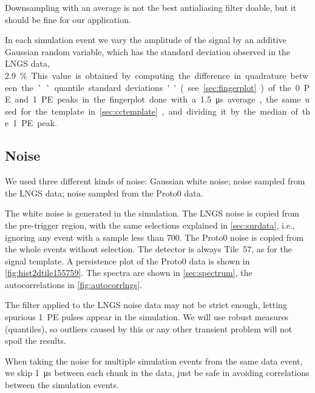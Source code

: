 Downsampling with an average is not the best antialiasing filter doable, but it
should be fine for our application.

In each simulation event we vary the amplitude of the signal by an additive
Gaussian random variable, which has the standard deviation observed in the LNGS
data, \SI{2.9}\%. This value is obtained by computing the difference in
quadrature between the ``quantile standard deviations'' (see
\autoref{sec:fingerplot}) of the \SI{0}{PE} and \SI{1}{PE} peaks in the
fingerplot done with a \SI{1.5}{\micro s} average, the same used for the
template in \autoref{sec:cctemplate}, and dividing it by the median of the
\SI{1}{PE} peak.

\begin{figure}
    


\end{figure}

\subsection{Noise}

We used three different kinds of noise: Gaussian white noise; noise sampled
from the LNGS data; noise sampled from the Proto0 data.

The white noise is generated in the simulation. The LNGS noise is copied from
the pre-trigger region, with the same selections explained in
\autoref{sec:snrdata}, i.e., ignoring any event with a sample less than 700.
The Proto0 noise is copied from the whole events without selection. The
detector is always Tile~57, as for the signal template. A persistence plot of
the Proto0 data is shown in \autoref{fig:hist2dtile155759}. The spectra are
shown in \autoref{sec:spectrum}, the autocorrelations in
\autoref{fig:autocorrlngs}.

The filter applied to the LNGS noise data may not be strict enough, letting
spurious \SI{1}{PE} pulses appear in the simulation. We will use robust
measures (quantiles), so outliers caused by this or any other transient problem
will not spoil the results.

When taking the noise for multiple simulation events from the same data event,
we skip \SI{1}{\micro s} between each chunk in the data, just be safe in
avoiding correlations between the simulation events.

